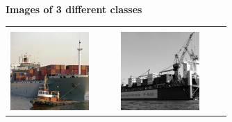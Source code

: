 \begin{figure}[h]
\centering
\textbf{Images of 3 different classes}

\begin{tabular}{|p{0.4\linewidth}p{0.4\linewidth}|}
\hline & \\
\includegraphics[width=\linewidth,frame]{figures/examples_assests/clustering/0_1.pdf} &
\includegraphics[width=\linewidth,frame]{figures/examples_assests/clustering/0_2.pdf} \\

\end{tabular}
\end{figure}
